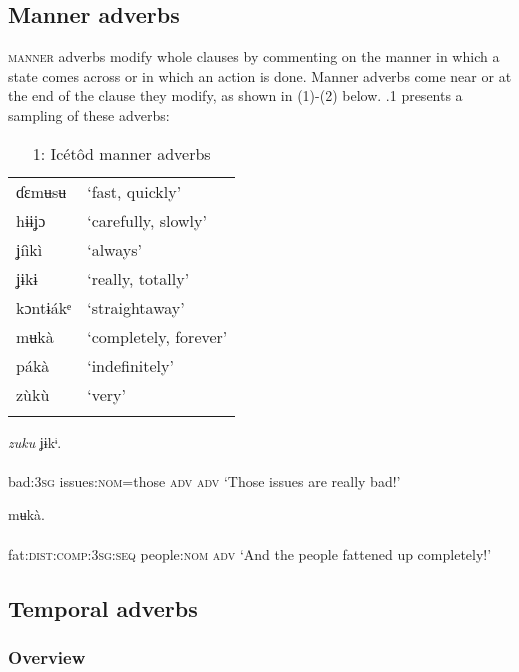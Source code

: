 \subsection{Manner adverbs}


\textsc{manner} adverbs modify whole clauses by commenting on the manner in which a state comes across or in which an action is done. Manner adverbs come near or at the end of the clause they modify, as shown in (1)-(2) below. .1 presents a sampling of these adverbs:


\begin{table}
\caption{1: Icétôd manner adverbs}
\label{tab:9}


\begin{tabularx}{\textwidth}{XX}
\lsptoprule

ɗɛmʉsʉ & ‘fast, quickly’\\
hɨɨʝɔ & ‘carefully, slowly’\\
ʝíìkì & ‘always’\\
ʝɨkɨ & ‘really, totally’\\
kɔntɨákᵉ & ‘straightaway’\\
mʉkà & ‘completely, forever’\\
pákà & ‘indefinitely’\\
zùkù & ‘very’\\
\lspbottomrule
\end{tabularx}
\end{table}



\ea\label{ex:}
     \textit{zuku}\textit{}   ʝɨkᶤ. \\
    \\
bad:\textsc{3sg}   issues:\textsc{nom}=those   \textsc{adv   adv}
\glt ‘Those issues are really bad!’ 
\z




\ea\label{ex:}
     mʉkà. \\
    \\
fat:\textsc{dist:comp:3sg:seq}   people:\textsc{nom}   \textsc{adv}
\glt ‘And the people fattened up completely!’ 
\z






\subsection{Temporal adverbs}
\subsubsection{Overview}

